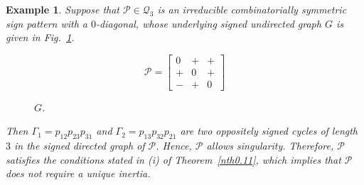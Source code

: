 \documentclass[a4paper, 10pt]{article}
\newtheorem{eg}{Example}[section]
\numberwithin{equation}{section}
\begin{document}
\begin{eg}\label{xxeg1}
	Suppose that $\mathcal{P}\in \mathcal{Q}_3$ is an irreducible combinatorially symmetric sign pattern with a $0$-diagonal, whose underlying signed undirected graph $G$ is given in Fig.~\ref{xx1}.
	\begin{figure}[H]
		\centering
		\begin{minipage}{.45\textwidth}
			\vspace{-1cm}
			\[
			\mathcal{P}=
			\begin{bmatrix}
				0 & + & + \\
				+ & 0 & + \\
				- & + & 0
			\end{bmatrix}
			\]
		\end{minipage}
		\hspace{0.05\textwidth}
		\begin{minipage}{.45\textwidth}
			\centering
			\tikzset{node distance=1cm}
			\caption{ $G$.}
			\label{xx1}
		\end{minipage}
	\end{figure}
	
	Then $\Gamma_1 = p_{12}p_{23}p_{31}$ and $\Gamma_2 = p_{13}p_{32}p_{21}$ are two oppositely signed cycles of length $3$ in the signed directed graph of $\mathcal{P}$. Hence, $\mathcal{P}$ allows singularity. Therefore, $\mathcal{P}$ satisfies the conditions stated in (i) of Theorem~\ref{nth0.11}, which implies that $\mathcal{P}$  does not require a unique inertia.
\end{eg}
\end{document}
